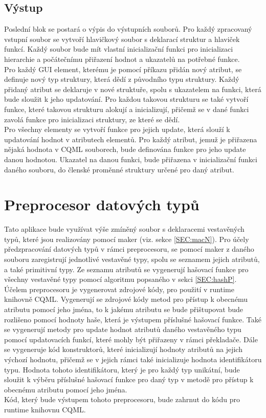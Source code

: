 \documentclass[report,11pt]{elsarticle}
\begin{document}
\subsection{Výstup}
Poslední blok se postará o výpis do výstupních souborů. Pro každý zpracovaný vstupní soubor se vytvoří hlavičkový soubor s deklarací struktur a hlaviček funkcí. Každý soubor bude mít vlastní inicializační funkci pro inicializaci hierarchie a počátečnímu přiřazení hodnot a ukazatelů na potřebné funkce.\\
Pro každý GUI element, kterému je pomocí příkazu přidán nový atribut, se definuje nový typ struktury, která dědí z původního typu struktury. Každý přidaný atribut se deklaruje v nové struktuře, spolu s ukazatelem na funkci, která bude sloužit k jeho updatování. Pro každou takovou strukturu se také vytvoří funkce, které takovou strukturu alokují a inicializují, přičemž se v dané funkci zavolá funkce pro inicializaci struktury, ze které se dědí.\\
Pro všechny elementy se vytvoří funkce pro jejich update, která slouží k updatování hodnot v atributech elementů. Pro každý atribut, jemuž je přiřazena nějaká hodnota v CQML souborech, bude definována funkce pro jeho update danou hodnotou. Ukazatel na danou funkci, bude přiřazena v inicializační funkci daného souboru, do členské proměnné struktury určené pro daný atribut.\\


\section{\label{SEC:prepN}Preprocesor datových typů}
Tato aplikace bude využívat výše zmíněný soubor s deklaracemi vestavěných typů, které jsou realizovány pomocí maker (viz. sekce \ref{SEC:macN}). Pro účely předzpracování datových typů v rámci preprocesoru, se pomocí maker z daného souboru zaregistrují jednotlivé vestavěné typy, spolu se seznamem jejich atributů, a také primitivní typy. Ze seznamu atributů se vygenerují hašovací funkce pro všechny vestavěné typy pomocí algoritmu popsaného v sekci \ref{SEC:hashP}.\\
Účelem preprocesoru je vygenerovat zdrojové kódy, pro použití v runtime knihovně CQML. Vygenerují se zdrojové kódy metod pro přístup k obecnému atributu pomocí jeho jména, to k jakému atributu se bude přištupovat bude rozlišeno pomocí hodnoty haše, která je výstupem příslušné hašovací funkce. Také se vygenerují metody pro update hodnot atributů daného vestavěného typu pomocí updatovacích funkcí, které mohly být přiřazeny v rámci překladače. Dále se vygeneruje kód konstruktorů, které inicializují hodnoty atributů na jejich výchozí hodnotu, přičemž se v jejich rámci také inicializuje hodnota identifikátoru typu. Hodnota tohoto identifikátoru, který je pro každý typ unikátní, bude sloužit k výběru příslušné hašovací funkce pro daný typ v metodě pro přístup k obecnému atributu pomocí jeho jména.\\
Kód, který bude výstupem tohoto preprocesoru, bude zahrnut do kódu pro runtime knihovnu CQML.\\
\end{document}

